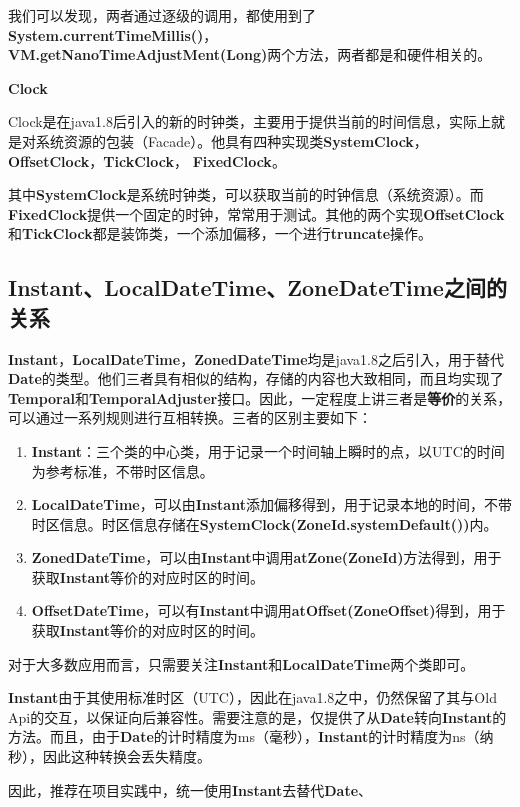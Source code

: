 \documentclass[cn,10pt,math=newtx,citestyle=gb7714-2015,bibstyle=gb7714-2015]{elegantbook}
\begin{document}
    我们可以发现，两者通过逐级的调用，都使用到了\textbf{System.currentTimeMillis()}，\\ \textbf{VM.getNanoTimeAdjustMent(Long)}两个方法，两者都是和硬件相关的。

    \textbf{Clock}
    
    Clock是在java1.8后引入的新的时钟类，主要用于提供当前的时间信息，实际上就是对系统资源的包装（Facade）。他具有四种实现类\textbf{SystemClock}，\textbf{OffsetClock}，\textbf{TickClock}，
    \textbf{FixedClock}。
    
    其中\textbf{SystemClock}是系统时钟类，可以获取当前的时钟信息（系统资源）。而\textbf{FixedClock}提供一个固定的时钟，常常用于测试。其他的两个实现\textbf{OffsetClock}和\textbf{TickClock}都是装饰类，一个添加偏移，一个进行\textbf{truncate}操作。

    \subsection{Instant、LocalDateTime、ZoneDateTime之间的关系}

    \textbf{Instant}，\textbf{LocalDateTime}，\textbf{ZonedDateTime}均是java1.8之后引入，用于替代\textbf{Date}的类型。他们三者具有相似的结构，存储的内容也大致相同，而且均实现了\textbf{Temporal}和\textbf{TemporalAdjuster}接口。因此，一定程度上讲三者是\textbf{等价}的关系，可以通过一系列规则进行互相转换。三者的区别主要如下：

    \begin{enumerate}
        \item \textbf{Instant}：三个类的中心类，用于记录一个时间轴上瞬时的点，以UTC的时间为参考标准，不带时区信息。
        \item \textbf{LocalDateTime}，可以由\textbf{Instant}添加偏移得到，用于记录本地的时间，不带时区信息。时区信息存储在\textbf{SystemClock(ZoneId.systemDefault())}内。
        \item \textbf{ZonedDateTime}，可以由\textbf{Instant}中调用\textbf{atZone(ZoneId)}方法得到，用于获取\textbf{Instant}等价的对应时区的时间。
        \item \textbf{OffsetDateTime}，可以有\textbf{Instant}中调用\textbf{atOffset(ZoneOffset)}得到，用于获取\textbf{Instant}等价的对应时区的时间。
    \end{enumerate}

    对于大多数应用而言，只需要关注\textbf{Instant}和\textbf{LocalDateTime}两个类即可。

    \begin{note}
        \textbf{Instant}由于其使用标准时区（UTC），因此在java1.8之中，仍然保留了其与Old Api的交互，以保证向后兼容性。需要注意的是，仅提供了从\textbf{Date}转向\textbf{Instant}的方法。而且，由于\textbf{Date}的计时精度为ms（毫秒），\textbf{Instant}的计时精度为ns（纳秒），因此这种转换会丢失精度。

        因此，推荐在项目实践中，统一使用\textbf{Instant}去替代\textbf{Date}、
    \end{note}
\end{document}

